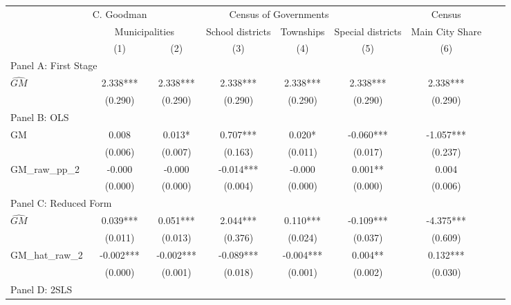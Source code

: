  \begin{tabular}{l*{8}{c}} \toprule
&\multicolumn{1}{c}{C. Goodman}&\multicolumn{4}{c}{Census of Governments}&\multicolumn{1}{c}{Census}\\\cmidrule(lr){2-2}\cmidrule(lr){3-6}\cmidrule(lr){7-7}
&\multicolumn{2}{c}{Municipalities}&\multicolumn{1}{c}{School districts}&\multicolumn{1}{c}{Townships}&\multicolumn{1}{c}{Special districts}&\multicolumn{1}{c}{Main City Share}\\\cmidrule(lr){2-3}\cmidrule(lr){4-6}\cmidrule(lr){7-7}
&\multicolumn{1}{c}{(1)}&\multicolumn{1}{c}{(2)}&\multicolumn{1}{c}{(3)}&\multicolumn{1}{c}{(4)}&\multicolumn{1}{c}{(5)}&\multicolumn{1}{c}{(6)}\\
\cmidrule(lr){1-7}
\multicolumn{6}{l}{Panel A: First Stage}\\
\cmidrule(lr){1-7}
$\widehat{GM}$  &    2.338***&    2.338***&    2.338***&    2.338***&    2.338***&    2.338***\\
                &  (0.290)   &  (0.290)   &  (0.290)   &  (0.290)   &  (0.290)   &  (0.290)   \\
\cmidrule(lr){1-7}
\multicolumn{6}{l}{Panel B: OLS}\\
\cmidrule(lr){1-7}
GM              &    0.008   &    0.013*  &    0.707***&    0.020*  &   -0.060***&   -1.057***\\
                &  (0.006)   &  (0.007)   &  (0.163)   &  (0.011)   &  (0.017)   &  (0.237)   \\
\addlinespace
GM\_raw\_pp\_2     &   -0.000   &   -0.000   &   -0.014***&   -0.000   &    0.001** &    0.004   \\
                &  (0.000)   &  (0.000)   &  (0.004)   &  (0.000)   &  (0.000)   &  (0.006)   \\
\cmidrule(lr){1-7}
\multicolumn{6}{l}{Panel C: Reduced Form}\\
\cmidrule(lr){1-7}
$\widehat{GM}$  &    0.039***&    0.051***&    2.044***&    0.110***&   -0.109***&   -4.375***\\
                &  (0.011)   &  (0.013)   &  (0.376)   &  (0.024)   &  (0.037)   &  (0.609)   \\
\addlinespace
GM\_hat\_raw\_2    &   -0.002***&   -0.002***&   -0.089***&   -0.004***&    0.004** &    0.132***\\
                &  (0.000)   &  (0.001)   &  (0.018)   &  (0.001)   &  (0.002)   &  (0.030)   \\
\cmidrule(lr){1-7}
\multicolumn{6}{l}{Panel D: 2SLS}\\
\cmidrule(lr){1-7}

\end{tabular}
